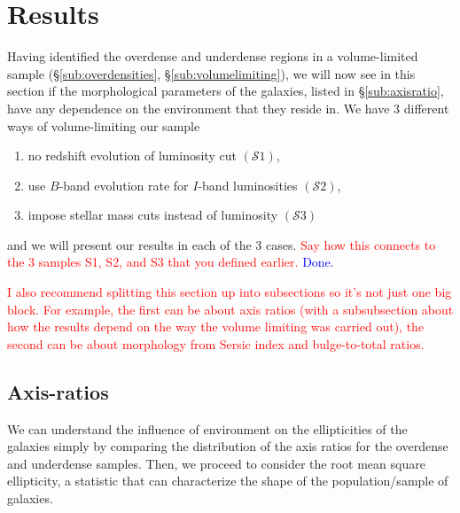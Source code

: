 \documentclass[twocolumn,useAMS,usenatbib]{mn2e}
\newcommand{\rachel}[1]{{\textcolor{red}{#1}}}
\newcommand{\arun}[1]{{\textcolor{blue}{#1}}}
\newcommand{\s}{\ensuremath{\mathcal{S}}}
\begin{document}
\section{Results}
\label{S:results}
Having identified the overdense and underdense regions in a volume-limited sample (\S\ref{sub:overdensities}, \S\ref{sub:volumelimiting}), we will now see in this section if the morphological
parameters of the galaxies, listed in \S\ref{sub:axisratio}, have any dependence on the environment that they reside in. We have 3 different ways of volume-limiting our sample
\begin{enumerate}
 \item no redshift evolution of luminosity cut $(\s1)$,
 \item use $B$-band evolution rate for $I$-band luminosities $(\s2)$,
 \item impose stellar mass cuts instead of luminosity $(\s3)$
\end{enumerate}
and we will present our results in each of the 3 cases. 
\rachel{Say how this connects to the 3 samples S1, S2, and S3 that you defined earlier.} \arun{Done.}

\rachel{I also recommend splitting this section up into subsections so
  it's not just one big block.  For example, the first can be about
  axis ratios (with a subsubsection about how the results depend on
  the way the volume limiting was carried out), the second can be
  about morphology from Sersic index and bulge-to-total ratios.}

\subsection{Axis-ratios} 
We can understand the influence of environment on the ellipticities of the galaxies simply by comparing the distribution of the axis ratios for the overdense and underdense samples. 
Then, we proceed to consider the root mean square ellipticity, a statistic that can characterize the shape of the population/sample of galaxies. 
\end{document}
